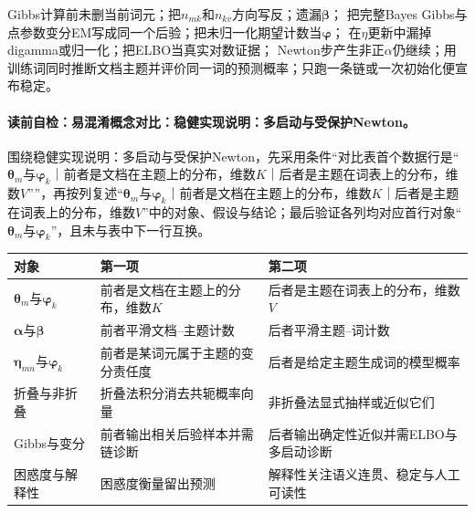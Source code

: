 \label{struct:V5-C06-CH30}
\begin{pitfallbox}
Gibbs计算前未删当前词元；把$n_{mk}$和$n_{kv}$方向写反；遗漏$\boldsymbol\beta$；
把完整Bayes Gibbs与点参数变分EM写成同一个后验；把未归一化期望计数当$\boldsymbol\varphi$；
在$\eta$更新中漏掉digamma或归一化；把ELBO当真实对数证据；
Newton步产生非正$\alpha$仍继续；用训练词同时推断文档主题并评价同一词的预测概率；只跑一条链或一次初始化便宣布稳定。
\end{pitfallbox}

\label{struct:V5-C06-CH31}
\paragraph{读前自检：易混淆概念对比：稳健实现说明：多启动与受保护Newton。}围绕稳健实现说明：多启动与受保护Newton，先采用条件“对比表首个数据行是“$\boldsymbol\theta_m$与$\boldsymbol\varphi_k$｜前者是文档在主题上的分布，维数$K$｜后者是主题在词表上的分布，维数$V$””，再按列复述“$\boldsymbol\theta_m$与$\boldsymbol\varphi_k$｜前者是文档在主题上的分布，维数$K$｜后者是主题在词表上的分布，维数$V$”中的对象、假设与结论；最后验证各列均对应首行对象“$\boldsymbol\theta_m$与$\boldsymbol\varphi_k$”，且未与表中下一行互换。\par

\begin{comparisonbox}
\small
\begin{tabularx}{\textwidth}{@{}p{}XX@{}}
\toprule
对象 & 第一项 & 第二项 \\
\midrule
$\boldsymbol\theta_m$与$\boldsymbol\varphi_k$ & 前者是文档在主题上的分布，维数$K$ & 后者是主题在词表上的分布，维数$V$ \\
$\boldsymbol\alpha$与$\boldsymbol\beta$ & 前者平滑文档--主题计数 & 后者平滑主题--词计数 \\
$\boldsymbol\eta_{mn}$与$\boldsymbol\varphi_k$ & 前者是某词元属于主题的变分责任度 & 后者是给定主题生成词的模型概率 \\
折叠与非折叠 & 折叠法积分消去共轭概率向量 & 非折叠法显式抽样或近似它们 \\
Gibbs与变分 & 前者输出相关后验样本并需链诊断 & 后者输出确定性近似并需ELBO与多启动诊断 \\
困惑度与解释性 & 困惑度衡量留出预测 & 解释性关注语义连贯、稳定与人工可读性 \\
\bottomrule
\end{tabularx}
\end{comparisonbox}


